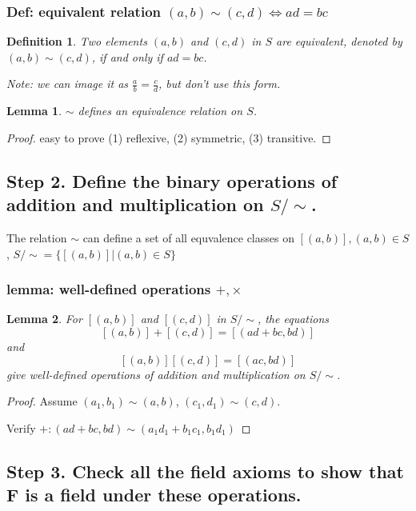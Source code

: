 \documentclass[11pt,a4paper]{article}
\newtheorem{lemma}{Lemma}
\newtheorem{definition}{Definition}
\begin{document}
\subsubsection{Def: equivalent relation $(a,b)\sim(c,d) \Leftrightarrow	ad = bc$}
\begin{definition}
    Two elements $(a, b)$ and $(c, d)$ in $S$ are equivalent, denoted by $(a, b) \sim (c, d)$, if and only if $ad = bc$.

    Note: we can image it as $\frac{a}{b}=\frac{c}{d}$, but don't use this form.
\end{definition}

\begin{lemma}
    $\sim$ defines an equivalence relation on $S$.
\end{lemma}
\begin{proof}
easy to prove (1) reflexive, (2) symmetric, (3) transitive.
\end{proof}

\subsection{Step 2. Define the binary operations of addition and multiplication on $S/\sim$.}
The relation $\sim$ can define a set of all equvalence classes on $[(a,b)], (a,b)\in S$, $S/\sim=\{[(a,b)]|(a,b)\in S\}$
\subsubsection{lemma: well-defined operations $+,\times$}
\begin{lemma}
    For $[(a, b)]$ and $[(c, d)]$ in $S/\sim$, the equations
    $$
    [(a, b)]+[(c, d)]=[(a d+b c, b d)]
    $$
    and
    $$
    [(a, b)][(c, d)]=[(a c, b d)]
    $$
    give well-defined operations of addition and multiplication on $S/\sim$.
\end{lemma}
\begin{proof}
Assume $(a_1,b_1)\sim(a,b)$, $(c_1,d_1)\sim (c,d)$.

Verify $+:(ad+bc,bd)\sim (a_1d_1+b_1c_1,b_1d_1)$

\end{proof}

\subsection{Step 3. Check all the field axioms to show that F is a field under these operations.}
\end{document}
